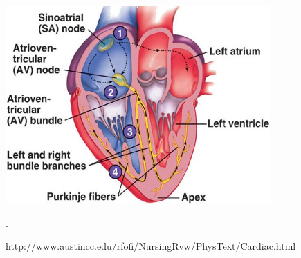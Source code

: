 \begin{figure}[h]
 \centering 
     \includegraphics[width=0.9\textwidth]{bilder/b_electrical_heart}
     \caption{http://www.austincc.edu/rfofi/NursingRvw/PhysText/Cardiac.html}.
     \label{b_electrical_heart.png}
\end{figure}













